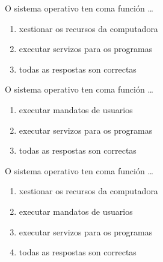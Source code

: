 \begin{diapo}\begin{frame}{O sistema operativo ten coma función \dots}
\begin{enumerate}
\item xestionar os recursos da computadora \pause
\item executar servizos para os programas\pause
\item todas as respostas son correctas
\end{enumerate} 
\end{frame} 
\end{diapo}
\begin{diapo}\begin{frame}{O sistema operativo ten coma función \dots}
\begin{enumerate}
\item executar mandatos de usuarios \pause
\item executar servizos para os programas\pause
\item todas as respostas son correctas
\end{enumerate} 
\end{frame}
\end{diapo}

\begin{diapo}\begin{frame}{O sistema operativo ten coma función \dots}
\begin{enumerate}
\item xestionar os recursos da computadora \pause
\item executar mandatos de usuarios \pause
\item executar servizos para os programas\pause
\item todas as respostas son correctas
\end{enumerate} 
\end{frame}
\end{diapo}


